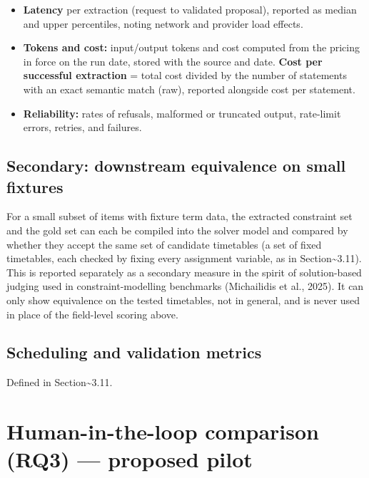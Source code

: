 \documentclass[
  11pt,a4paper,oneside]{report}
\providecommand{\tightlist}{%
  \setlength{\itemsep}{0pt}\setlength{\parskip}{0pt}}
\begin{document}
\begin{itemize}
\tightlist
\item
  \textbf{Latency} per extraction (request to validated proposal),
  reported as median and upper percentiles, noting network and provider
  load effects.
\item
  \textbf{Tokens and cost:} input/output tokens and cost computed from
  the pricing in force on the run date, stored with the source and date.
  \textbf{Cost per successful extraction} = total cost divided by the
  number of statements with an exact semantic match (raw), reported
  alongside cost per statement.
\item
  \textbf{Reliability:} rates of refusals, malformed or truncated
  output, rate-limit errors, retries, and failures.
\end{itemize}

\hypertarget{395a-secondary-downstream-equivalence-on-small-fixtures}{%
\subsection{Secondary: downstream equivalence on small
fixtures}\label{395a-secondary-downstream-equivalence-on-small-fixtures}}

For a small subset of items with fixture term data, the extracted
constraint set and the gold set can each be compiled into the solver
model and compared by whether they accept the same set of candidate
timetables (a set of fixed timetables, each checked by fixing every
assignment variable, as in Section\textasciitilde3.11). This is reported
separately as a secondary measure in the spirit of solution-based
judging used in constraint-modelling benchmarks (Michailidis et al.,
2025). It can only show equivalence on the tested timetables, not in
general, and is never used in place of the field-level scoring above.

\hypertarget{scheduling-and-validation-metrics}{%
\subsection{Scheduling and validation
metrics}\label{scheduling-and-validation-metrics}}

Defined in Section\textasciitilde3.11.

\hypertarget{human-in-the-loop-comparison-rq3--proposed-pilot}{%
\section{Human-in-the-loop comparison (RQ3) --- proposed
pilot}\label{human-in-the-loop-comparison-rq3--proposed-pilot}}
\end{document}
